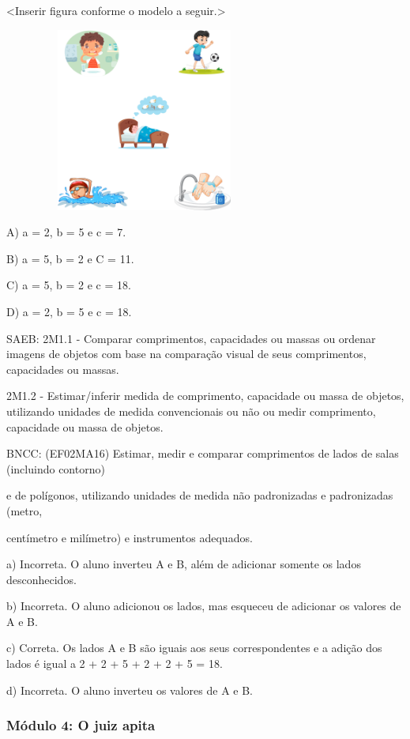 \textless{}Inserir figura conforme o modelo a seguir.\textgreater{}

\includegraphics[width=3.63542in,height=2.37500in]{media/image57.png}

A) a = 2, b = 5 e c = 7.

B) a = 5, b = 2 e C = 11.

C) a = 5, b = 2 e c = 18.

D) a = 2, b = 5 e c = 18.

SAEB: 2M1.1 - Comparar comprimentos, capacidades ou massas ou ordenar
imagens de objetos com base na comparação visual de seus comprimentos,
capacidades ou massas.

2M1.2 - Estimar/inferir medida de comprimento, capacidade ou massa de
objetos, utilizando unidades de medida convencionais ou não ou medir
comprimento, capacidade ou massa de objetos.

BNCC: (EF02MA16) Estimar, medir e comparar comprimentos de lados de
salas (incluindo contorno)

e de polígonos, utilizando unidades de medida não padronizadas e
padronizadas (metro,

centímetro e milímetro) e instrumentos adequados.

a) Incorreta. O aluno inverteu A e B, além de adicionar somente os lados
desconhecidos.

b) Incorreta. O aluno adicionou os lados, mas esqueceu de adicionar os
valores de A e B.

c) Correta. Os lados A e B são iguais aos seus correspondentes e a
adição dos lados é igual a 2 + 2 + 5 + 2 + 2 + 5 = 18.

d) Incorreta. O aluno inverteu os valores de A e B.

\subsubsection{Módulo 4: O juiz apita}\label{muxf3dulo-4-o-juiz-apita}

